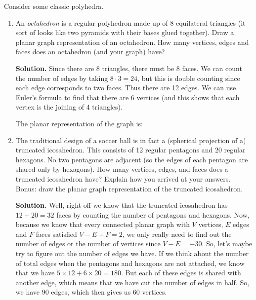 \documentclass{book}
\begin{document}
\setcounter{project}{34}
\addtocounter{project}{-1}
\begin{activity}[]\label{activity-29}
\hypertarget{p-324}{}%
Consider some classic polyhedra.%
\begin{enumerate}[font=\bfseries,label=(\alph*),ref=\alph*]
\item\label{task-43} \hypertarget{p-325}{}%
An \emph{octahedron} is a regular polyhedron made up of 8 equilateral triangles (it sort of looks like two pyramids with their bases glued together). Draw a planar graph representation of an octahedron. How many vertices, edges and faces does an octahedron (and your graph) have?%
\par\smallskip%
\noindent\textbf{Solution.}\hypertarget{solution-26}{}\quad%
\hypertarget{p-326}{}%
Since there are 8 triangles, there must be 8 faces. We can count the number of edges by taking \(8 \cdot 3 = 24\), but this is double counting since each edge corresponds to two faces. Thus there are 12 edges. We can use Euler's formula to find that there are 6 vertices (and this shows that each vertex is the joining of 4 triangles).%
\par
\hypertarget{p-327}{}%
The planar representation of the graph is:%
\item\label{task-44} \hypertarget{p-328}{}%
The traditional design of a soccer ball is in fact a (spherical projection of a) truncated icosahedron. This consists of 12 regular pentagons and 20 regular hexagons. No two pentagons are adjacent (so the edges of each pentagon are shared only by hexagons). How many vertices, edges, and faces does a truncated icosahedron have? Explain how you arrived at your answers. Bonus: draw the planar graph representation of the truncated icosahedron.%
\par\smallskip%
\noindent\textbf{Solution.}\hypertarget{solution-27}{}\quad%
\hypertarget{p-329}{}%
Well, right off we know that the truncated icosahedron has \(12+20=32\) faces by counting the number of pentagons and hexagons. Now, because we know that every connected planar graph with \(V\) vertices, \(E\) edges and \(F\) faces satisfied \(V - E + F = 2\), we only really need to find out the number of edges or the number of vertices since \(V-E=-30\). So, let's maybe try to figure out the number of edges we have. If we think about the number of total edges when the pentagons and hexagons are not attached, we know that we have \(5\times 12+6\times 20=180\). But each of these edges is shared with another edge, which means that we have cut the number of edges in half. So, we have \(90\) edges, which then gives us \(60\) vertices.%

\end{enumerate}
\end{activity}
\end{document}
